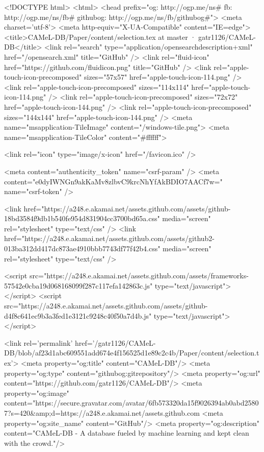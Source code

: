   


<!DOCTYPE html>
<html>
  <head prefix="og: http://ogp.me/ns# fb: http://ogp.me/ns/fb# githubog: http://ogp.me/ns/fb/githubog#">
    <meta charset='utf-8'>
    <meta http-equiv="X-UA-Compatible" content="IE=edge">
        <title>CAMeL-DB/Paper/content/selection.tex at master · gatr1126/CAMeL-DB</title>
    <link rel="search" type="application/opensearchdescription+xml" href="/opensearch.xml" title="GitHub" />
    <link rel="fluid-icon" href="https://github.com/fluidicon.png" title="GitHub" />
    <link rel="apple-touch-icon-precomposed" sizes="57x57" href="apple-touch-icon-114.png" />
    <link rel="apple-touch-icon-precomposed" sizes="114x114" href="apple-touch-icon-114.png" />
    <link rel="apple-touch-icon-precomposed" sizes="72x72" href="apple-touch-icon-144.png" />
    <link rel="apple-touch-icon-precomposed" sizes="144x144" href="apple-touch-icon-144.png" />
    <meta name="msapplication-TileImage" content="/windows-tile.png">
    <meta name="msapplication-TileColor" content="#ffffff">

    
    
    <link rel="icon" type="image/x-icon" href="/favicon.ico" />

    <meta content="authenticity_token" name="csrf-param" />
<meta content="e0dyIWNGn9akKaMv8zlbvC9krcNhYfAkBDIO7AACf7w=" name="csrf-token" />

    <link href="https://a248.e.akamai.net/assets.github.com/assets/github-18bd3584f9db1b540fe954d831904cc3700bd65a.css" media="screen" rel="stylesheet" type="text/css" />
    <link href="https://a248.e.akamai.net/assets.github.com/assets/github2-013ba312dd417dc873ae4910bbb7743df77f42b4.css" media="screen" rel="stylesheet" type="text/css" />
    


    <script src="https://a248.e.akamai.net/assets.github.com/assets/frameworks-57542e0cba19d068168099f287c117efa142863c.js" type="text/javascript"></script>
    <script src="https://a248.e.akamai.net/assets.github.com/assets/github-d4f8c641ec9b3a3fed1e3121c9248c40f50a7d4b.js" type="text/javascript"></script>
    

      <link rel='permalink' href='/gatr1126/CAMeL-DB/blob/af23d1abc609551add674e4f156525d1e89c2c4b/Paper/content/selection.tex'>
    <meta property="og:title" content="CAMeL-DB"/>
    <meta property="og:type" content="githubog:gitrepository"/>
    <meta property="og:url" content="https://github.com/gatr1126/CAMeL-DB"/>
    <meta property="og:image" content="https://secure.gravatar.com/avatar/6fb573320da15f9026394ab0abd25807?s=420&amp;d=https://a248.e.akamai.net/assets.github.com%
    <meta property="og:site_name" content="GitHub"/>
    <meta property="og:description" content="CAMeL-DB - A database fueled by machine learning and kept clean with the crowd."/>

